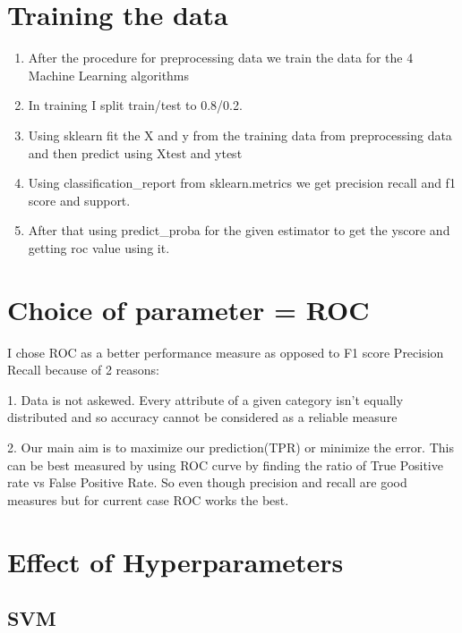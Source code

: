 \documentclass{article}
\begin{document}
\section{Training the data}

\begin{enumerate}
    \item After the procedure for preprocessing data we train the data for the 4 Machine Learning algorithms
    \item In training I split train/test to 0.8/0.2.
    \item Using sklearn fit the X and y from the training data from preprocessing data and then predict using Xtest and ytest
    \item Using classification\_report from sklearn.metrics we get precision recall and f1 score and support.
    \item After that using predict\_proba for the given estimator to get the yscore and getting roc value using it.
    
\end{enumerate}
 
\pagebreak

\section{Choice of parameter = ROC}

I chose ROC as a better performance measure as opposed to F1 score Precision Recall because of 2 reasons:

1. Data is not askewed. Every attribute of a given category isn't equally distributed and so accuracy cannot be considered as a reliable measure 

2. Our main aim is to maximize our prediction(TPR) or minimize the error. This can be best measured by using ROC curve by finding the ratio of True Positive rate vs False Positive Rate. So even though precision and recall are good measures but for current case ROC works the best.

\pagebreak

\section{ Effect of Hyperparameters}


\subsection{SVM}
\end{document}
